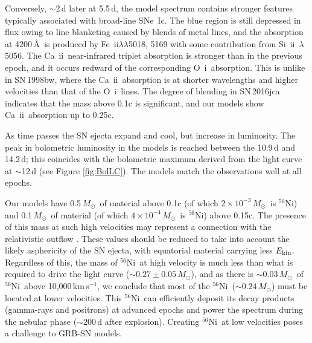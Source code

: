 \documentclass[fleqn,usenatbib]{mnras}
\newcommand{\Msun}{$M_{\odot}$}
\newcommand{\kms}{km\,s$^{-1}$}
\newcommand{\OI}{O~{\sc i}}
\newcommand{\SiII}{Si~{\sc ii}}
\newcommand{\CaII}{Ca~{\sc ii}}
\newcommand{\FeII}{Fe~{\sc ii}}
\newcommand{\Nifs}{$^{56}$Ni}
\newcommand{\KE}{$E_{\rm kin}$}
\newcommand{\ab}{$\sim$}
\begin{document}
Conversely, $\sim 2$\,d later at 5.5\,d, the model spectrum contains stronger 
features typically associated with broad-line SNe~Ic. 
The blue region is still depressed in flux owing to 
line blanketing caused by blends of metal lines, and the 
absorption at 4200\,\AA\ is produced by \FeII $\lambda\lambda$5018, 5169 with 
some contribution from \SiII\ $\lambda$5056. 
The \CaII\ near-infrared triplet absorption is stronger than in the previous epoch,
and it occurs redward of the corresponding \OI\ absorption. This 
is unlike in SN\,1998bw, where the \CaII\ absorption is at shorter wavelengths and 
higher velocities than that of the \OI\ lines. The degree of blending in SN\,2016jca 
indicates that
the mass above 0.1c is significant, and our models show \CaII\ absorption up to
0.25c.

As time passes the SN ejecta expand and cool, but increase in luminosity. 
The peak in bolometric luminosity in the models is reached
between the 10.9\,d and 14.2\,d;
this coincides with the bolometric maximum derived 
from the light curve at \ab12\,d (see Figure \ref{fig:BolLC}).  
The models match the observations well at all epochs. 

Our models have 0.5\,\Msun\ of material above 0.1c (of which $2 \times 10^{-3}$\,\Msun\ is \Nifs) and
0.1\,\Msun\ of material (of which $4 \times 10^{-4}$\,\Msun\ is \Nifs) above 0.15c.
The presence of
this mass at such high velocities may represent a connection with the relativistic
outflow \citep{Piran2017}. These values should be reduced to take into account the
likely asphericity of the SN ejecta, with equatorial material carrying less \KE.
Regardless of this, the mass of \Nifs\ at high velocity
is much less than what is required to drive the light curve
($\sim 0.27\pm0.05$\,\Msun), and as there is $\sim 0.03$\,\Msun\ of \Nifs\ above 10,000\,\kms, we conclude that most of the \Nifs\ ($\sim 0.24$\,\Msun) must be
located at lower velocities. This \Nifs\ can efficiently deposit its decay
products (gamma-rays and positrons) at advanced epochs and power the spectrum
during the nebular phase ($\sim 200$\,d after explosion). Creating \Nifs\ at low
velocities poses a challenge to GRB-SN models. 
\end{document}
